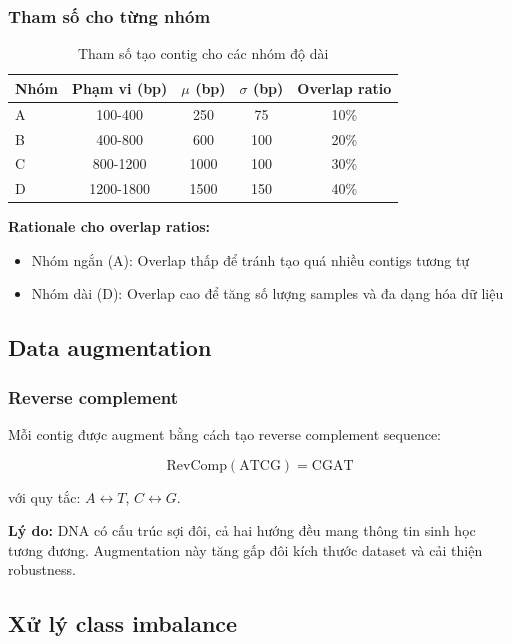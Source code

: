 \subsubsection{Tham số cho từng nhóm}

\begin{table}[h]
\centering
\caption{Tham số tạo contig cho các nhóm độ dài}
\label{tab:contig_params}
\begin{tabular}{lcccc}
\toprule
\textbf{Nhóm} & \textbf{Phạm vi (bp)} & \textbf{$\mu$ (bp)} & \textbf{$\sigma$ (bp)} & \textbf{Overlap ratio} \\
\midrule
A & 100-400 & 250 & 75 & 10\% \\
B & 400-800 & 600 & 100 & 20\% \\
C & 800-1200 & 1000 & 100 & 30\% \\
D & 1200-1800 & 1500 & 150 & 40\% \\
\bottomrule
\end{tabular}
\end{table}

\textbf{Rationale cho overlap ratios:}
\begin{itemize}
    \item Nhóm ngắn (A): Overlap thấp để tránh tạo quá nhiều contigs tương tự
    \item Nhóm dài (D): Overlap cao để tăng số lượng samples và đa dạng hóa dữ liệu
\end{itemize}

\subsection{Data augmentation}

\subsubsection{Reverse complement}

Mỗi contig được augment bằng cách tạo reverse complement sequence:

\begin{equation}
\text{RevComp}(\text{ATCG}) = \text{CGAT}
\end{equation}

với quy tắc: $A \leftrightarrow T$, $C \leftrightarrow G$.

\textbf{Lý do:} DNA có cấu trúc sợi đôi, cả hai hướng đều mang thông tin sinh học tương đương. Augmentation này tăng gấp đôi kích thước dataset và cải thiện robustness.

\subsection{Xử lý class imbalance}

